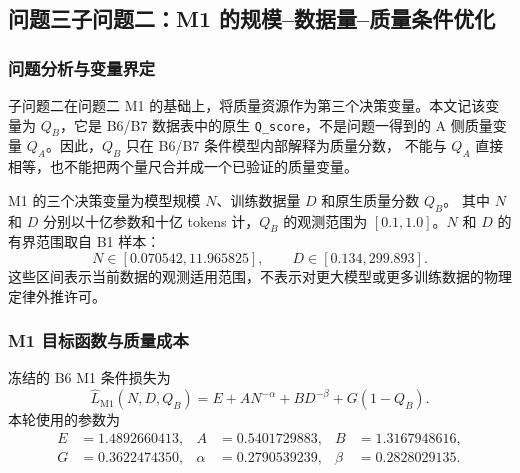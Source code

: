 
\subsection{问题三子问题二：M1 的规模--数据量--质量条件优化}
\label{sec:q3-subproblem2}

\subsubsection{问题分析与变量界定}

子问题二在问题二 M1 的基础上，将质量资源作为第三个决策变量。本文记该变量为
$Q_B$，它是 B6/B7 数据表中的原生 \texttt{Q\_score}，不是问题一得到的
A 侧质量变量 $Q_A$。因此，$Q_B$ 只在 B6/B7 条件模型内部解释为质量分数，
不能与 $Q_A$ 直接相等，也不能把两个量尺合并成一个已验证的质量变量。

M1 的三个决策变量为模型规模 $N$、训练数据量 $D$ 和原生质量分数 $Q_B$。
其中 $N$ 和 $D$ 分别以十亿参数和十亿 tokens 计，$Q_B$ 的观测范围为
$[0.1,1.0]$。$N$ 和 $D$ 的有界范围取自 B1 样本：
\begin{equation}
  N\in[0.070542,11.965825],\qquad
  D\in[0.134,299.893].
  \label{eq:q3-sp2-support}
\end{equation}
这些区间表示当前数据的观测适用范围，不表示对更大模型或更多训练数据的物理定律外推许可。

\subsubsection{M1 目标函数与质量成本}

冻结的 B6 M1 条件损失为
\begin{equation}
  \widehat L_{\mathrm{M1}}(N,D,Q_B)
  =E+A N^{-\alpha}+B D^{-\beta}+G(1-Q_B).
  \label{eq:q3-sp2-m1-loss}
\end{equation}
本轮使用的参数为
\begin{equation}
\begin{aligned}
E&=1.4892660413, & A&=0.5401729883, & B&=1.3167948616,\\
G&=0.3622474350, & \alpha&=0.2790539239, &
\beta&=0.2828029135.
\end{aligned}
\label{eq:q3-sp2-m1-parameters}
\end{equation}

